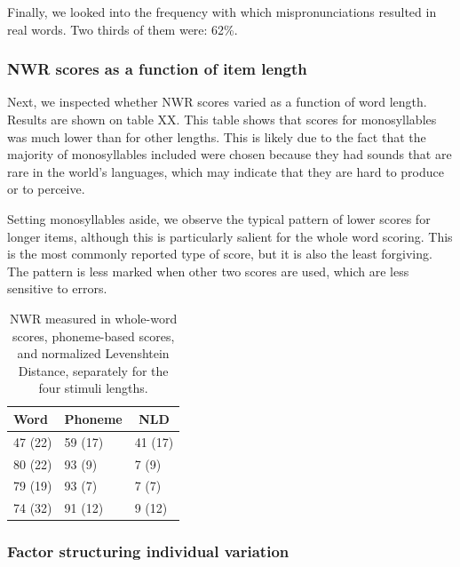 \documentclass[english,,man,floatsintext]{apa6}
\begin{document}
Finally, we looked into the frequency with which mispronunciations
resulted in real words. Two thirds of them were: 62\%.

\subsubsection{NWR scores as a function of item
length}\label{nwr-scores-as-a-function-of-item-length}

Next, we inspected whether NWR scores varied as a function of word
length. Results are shown on table XX. This table shows that scores for
monosyllables was much lower than for other lengths. This is likely due
to the fact that the majority of monosyllables included were chosen
because they had sounds that are rare in the world's languages, which
may indicate that they are hard to produce or to perceive.

Setting monosyllables aside, we observe the typical pattern of lower
scores for longer items, although this is particularly salient for the
whole word scoring. This is the most commonly reported type of score,
but it is also the least forgiving. The pattern is less marked when
other two scores are used, which are less sensitive to errors.

\begin{table}[tbp]
\begin{center}
\begin{threeparttable}
\caption{\label{tab:tablength}NWR measured in whole-word scores, phoneme-based scores, and normalized Levenshtein Distance, separately for the four stimuli lengths.}
\begin{tabular}{lll}
\toprule
Word & \multicolumn{1}{c}{Phoneme} & \multicolumn{1}{c}{NLD}\\
\midrule
47 (22) & 59 (17) & 41 (17)\\
80 (22) & 93 (9) & 7 (9)\\
79 (19) & 93 (7) & 7 (7)\\
74 (32) & 91 (12) & 9 (12)\\
\bottomrule
\end{tabular}
\end{threeparttable}
\end{center}
\end{table}

\subsubsection{Factor structuring individual
variation}\label{factor-structuring-individual-variation}
\end{document}
